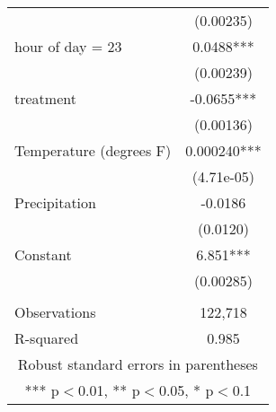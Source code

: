 \begin{tabular}{lc}
 & (0.00235) \\
hour of day = 23 & 0.0488*** \\
 & (0.00239) \\
treatment & -0.0655*** \\
 & (0.00136) \\
Temperature (degrees F) & 0.000240*** \\
 & (4.71e-05) \\
Precipitation & -0.0186 \\
 & (0.0120) \\
Constant & 6.851*** \\
 & (0.00285) \\
 &  \\
Observations & 122,718 \\
 R-squared & 0.985 \\ \hline
\multicolumn{2}{c}{ Robust standard errors in parentheses} \\
\multicolumn{2}{c}{ *** p$<$0.01, ** p$<$0.05, * p$<$0.1} \\
\end{tabular}
